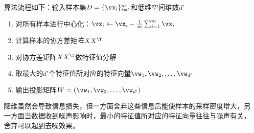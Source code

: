 算法流程如下：输入样本集$D=\{\vx_i\}_{i=1}^m$和低维空间维数$d'$
\begin{enumerate}
	\item 对所有样本进行中心化：$\vx_i\gets \vx_i-\frac{1}{m}\sum_{i=1}^m\vx_i$
	\item 计算样本的协方差矩阵$XX^\T$
	\item 对协方差矩阵$XX^\T$做特征值分解
	\item 取最大的$d'$个特征值所对应的特征向量$\vw_1,\vw_2,\ldots,\vw_{d'}$
	\item 输出投影矩阵$W=(\vw_1,\vw_2,\ldots,\vw_{d'})$
\end{enumerate}

降维虽然会导致信息损失，但一方面舍弃这些信息后能使样本的采样密度增大，另一方面当数据收到噪声影响时，最小的特征值所对应的特征向量往往与噪声有关，舍弃可以起到去噪效果。